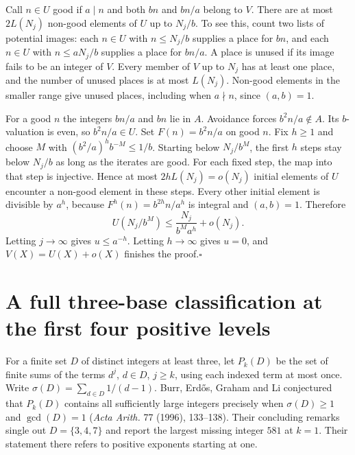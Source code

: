 \documentclass[11pt]{article}
\begin{document}
Call $n\in U$ good if $a\mid n$ and both $bn$ and $bn/a$ belong to $V$. There are at most $2L(N_j)$ non-good elements of $U$ up to $N_j/b$. To see this, count two lists of potential images: each $n\in U$ with $n\le N_j/b$ supplies a place for $bn$, and each $n\in U$ with $n\le aN_j/b$ supplies a place for $bn/a$. A place is unused if its image fails to be an integer of $V$. Every member of $V$ up to $N_j$ has at least one place, and the number of unused places is at most $L(N_j)$. Non-good elements in the smaller range give unused places, including when $a\nmid n$, since $(a,b)=1$.

For a good $n$ the integers $bn/a$ and $bn$ lie in $A$. Avoidance forces $b^2n/a\notin A$. Its $b$-valuation is even, so $b^2n/a\in U$. Set $F(n)=b^2n/a$ on good $n$. Fix $h\ge1$ and choose $M$ with $(b^2/a)^h b^{-M}\le1/b$. Starting below $N_j/b^M$, the first $h$ steps stay below $N_j/b$ as long as the iterates are good. For each fixed step, the map into that step is injective. Hence at most $2hL(N_j)=o(N_j)$ initial elements of $U$ encounter a non-good element in these steps. Every other initial element is divisible by $a^h$, because $F^h(n)=b^{2h}n/a^h$ is integral and $(a,b)=1$. Therefore
\[
 U(N_j/b^M)\le \frac{N_j}{b^M a^h}+o(N_j).
\]
Letting $j\to\infty$ gives $u\le a^{-h}$. Letting $h\to\infty$ gives $u=0$, and $V(X)=U(X)+o(X)$ finishes the proof.\hfill$\square$

\clearpage

\section{A full three-base classification at the first four positive levels}

For a finite set $D$ of distinct integers at least three, let $P_k(D)$
be the set of finite sums of the terms $d^j$, $d\in D$, $j\geq k$,
using each indexed term at most once. Write
$\sigma(D)=\sum_{d\in D}1/(d-1)$. Burr, Erd\H{o}s, Graham and Li
conjectured that $P_k(D)$ contains all sufficiently large integers
precisely when $\sigma(D)\geq1$ and $\gcd(D)=1$
(\emph{Acta Arith.} 77 (1996), 133--138).
Their concluding remarks single out $D=\{3,4,7\}$ and report the
largest missing integer $581$ at $k=1$. Their statement there refers
to positive exponents starting at one.
\end{document}
